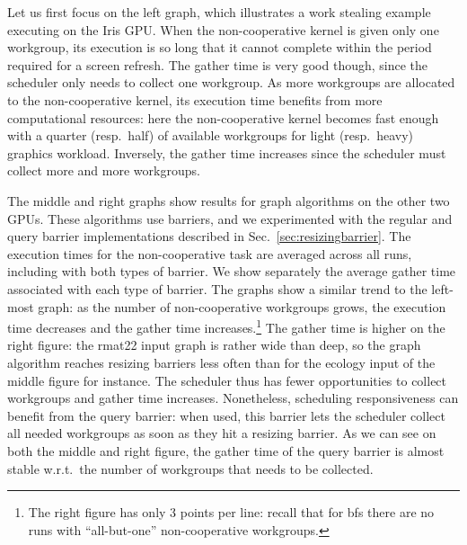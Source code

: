 \documentclass[numbers,nocopyrightspace,10pt]{sigplanconf}
\newcommand{\mysec}{Sec.~}
\begin{document}
Let us first focus on the left graph, which illustrates a work stealing
example executing on the Iris GPU.  When the non-cooperative kernel is given only one workgroup, its
execution is so long that it cannot complete within the period required for a screen refresh. The gather time is very good though, since the scheduler
only needs to collect one workgroup. As more workgroups are allocated to
the non-cooperative kernel, its execution time benefits from more computational
resources: here the non-cooperative
kernel becomes fast enough with a quarter (resp.\ half) of available
workgroups for light (resp.\ heavy) graphics workload. Inversely, the
gather time increases since the scheduler must collect more and more
workgroups.

The middle and right graphs show results for graph algorithms on the
other two GPUs.  These
algorithms use barriers, and we experimented with the regular and
query barrier implementations described in \mysec\ref{sec:resizingbarrier}.  The execution times for the non-cooperative task are averaged across all runs, including with both types of barrier.  We show separately the average gather time associated with each type of barrier.  The graphs show a similar trend to the left-most graph: as the number of non-cooperative workgroups grows, the
execution time decreases and the gather time increases.\footnote{The right
figure has only 3 points per line: recall that for bfs there are no runs
with ``all-but-one'' non-cooperative workgroups.}
%
The gather time is higher on the right figure: the rmat22 input graph is
rather wide than deep, so the graph algorithm reaches resizing barriers
less often than for the ecology input of the middle figure for
instance. The scheduler thus has fewer opportunities to collect
workgroups and gather time increases. Nonetheless, scheduling
responsiveness can benefit from the query barrier: when used, this
barrier lets the scheduler collect all needed workgroups as soon as they
hit a resizing barrier. As we can see on both the middle and right
figure, the gather time of the query barrier is almost stable w.r.t.\ the
number of workgroups that needs to be collected.
\end{document}
